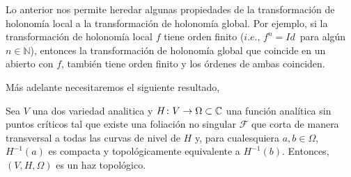 Lo anterior nos permite heredar algunas propiedades de la transformación de holonomía local a la transformación de holonomía global. Por ejemplo, si la transformación de holonomía local  $f$ tiene orden finito ($\mathit{i.e.},\, f^{n}=Id\,$ para algún $n\in\mathbb{N}$), entonces la transformación de holonomía global que coincide en un abierto con $f$, también tiene orden finito y los órdenes de ambas coinciden.\\


Más adelante necesitaremos el siguiente resultado,

\begin{Lema}
\label{Lema:HazTopologico}
Sea $V$ una dos variedad analitica y $H\colon V \rightarrow\Omega\subset\mathbb{C}$ una función analítica sin puntos críticos tal que existe una foliación no singular $\mathcal{F}$ que corta de manera transversal a todas las curvas de nivel de $H$ y, para cualesquiera $a,b\in \Omega$, $H^{-1}(a)$ es compacta y topológicamente equivalente a $H^{-1}(b)$. Entonces, $(V,H,\Omega)$ es un haz topológico.
\end{Lema}
